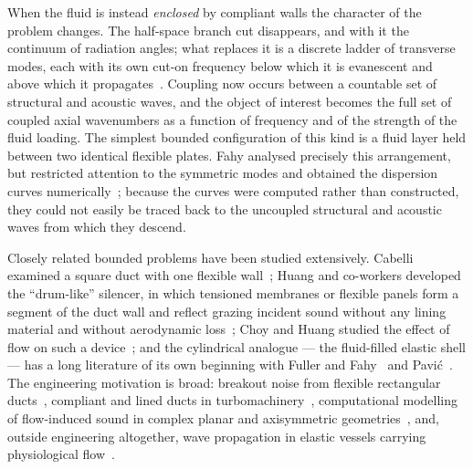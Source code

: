 \documentclass[11pt,a4paper]{article}
\theoremstyle{plain}
\theoremstyle{remark}
\begin{document}
When the fluid is instead \emph{enclosed} by compliant walls the character of the problem changes. The
half-space branch cut disappears, and with it the continuum of radiation angles; what replaces it is a
discrete ladder of transverse modes, each with its own cut-on frequency below which it is evanescent
and above which it propagates~\cite{morseingard,fahy}. Coupling now occurs between a countable set of
structural and acoustic waves, and the object of interest becomes the full set of coupled axial
wavenumbers as a function of frequency and of the strength of the fluid loading. The simplest bounded
configuration of this kind is a fluid layer held between two identical flexible plates. Fahy analysed
precisely this arrangement, but restricted attention to the symmetric modes and obtained the dispersion
curves numerically~\cite{fahy}; because the curves were computed rather than constructed, they could
not easily be traced back to the uncoupled structural and acoustic waves from which they descend.

Closely related bounded problems have been studied extensively. Cabelli examined a square duct with one
flexible wall~\cite{cabelli}; Huang and co-workers developed the ``drum-like'' silencer, in which
tensioned membranes or flexible panels form a segment of the duct wall and reflect grazing incident
sound without any lining material and without aerodynamic loss~\cite{huang2000,huang2002}; Choy and
Huang studied the effect of flow on such a device~\cite{choikim}; and the cylindrical analogue --- the
fluid-filled elastic shell --- has a long literature of its own beginning with Fuller and
Fahy~\cite{fullerfahy} and Pavi\'c~\cite{pavic}. The engineering motivation is broad: breakout noise
from flexible rectangular ducts~\cite{raviprolu}, compliant and lined ducts in
turbomachinery~\cite{rienstrahirschberg}, computational modelling of flow-induced sound in complex
planar and axisymmetric geometries~\cite{morab}, and, outside engineering altogether, wave propagation
in elastic vessels carrying physiological flow~\cite{grotberg,pedley}.
\end{document}

